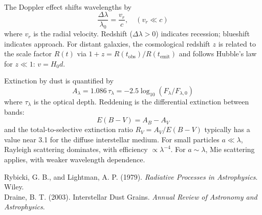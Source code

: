 \begin{technical}
\\[0.2em]
The Doppler effect shifts wavelengths by
\[
\frac{\Delta \lambda}{\lambda_0} = \frac{v_r}{c}, \quad (v_r \ll c)
\]
where \( v_r \) is the radial velocity. Redshift (\( \Delta \lambda > 0 \)) indicates recession; blueshift indicates approach. For distant galaxies, the cosmological redshift \( z \) is related to the scale factor \( R(t) \) via $1 + z = R(t_{\text{obs}})/R(t_{\text{emit}})$ and follows Hubble's law for \( z \ll 1 \): \( v = H_0 d \).

Extinction by dust is quantified by
\[
A_\lambda = 1.086\, \tau_\lambda = -2.5 \log_{10} \left( {F_\lambda}/{F_{\lambda,0}} \right)
\]
where \( \tau_\lambda \) is the optical depth. Reddening is the differential extinction between bands:
\[
E(B - V) = A_B - A_V
\]
and the total-to-selective extinction ratio \( R_V = A_V / E(B - V) \) typically has a value near 3.1 for the diffuse interstellar medium. For small particles \( a \ll \lambda \), Rayleigh scattering dominates, with efficiency \( \propto \lambda^{-4} \). For \( a \sim \lambda \), Mie scattering applies, with weaker wavelength dependence.

\techref
{\footnotesize
Rybicki, G. B., and Lightman, A. P. (1979). \textit{Radiative Processes in Astrophysics}. Wiley.\\
Draine, B. T. (2003). Interstellar Dust Grains. \textit{Annual Review of Astronomy and Astrophysics}.
}
\end{technical}
